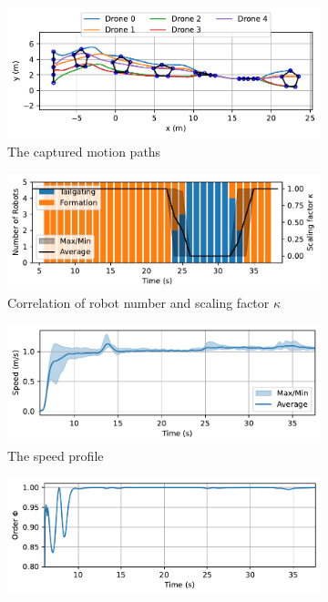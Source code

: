 \begin{figure}
    \centering
    \begin{subfigure}[b]{0.48\textwidth}
    \includegraphics[width=\textwidth]{paper3/images/gazebo_path.pdf}
    \caption{The captured motion paths}
    \label{fig:gazebo_path}
    \end{subfigure}
    \begin{subfigure}[b]{0.48\textwidth}
    \includegraphics[width=\textwidth]{paper3/images/gazebo_correlation.pdf}
    \caption{Correlation of robot number and scaling factor $\kappa$}
    \label{fig:gazebo_mode}
    \end{subfigure}
    \begin{subfigure}[b]{0.48\textwidth}
    \includegraphics[width=\textwidth]{paper3/images/gazebo_speed.pdf}
    \caption{The speed profile}
    \label{fig:gazebo_speed}
    \end{subfigure}
    \begin{subfigure}[b]{0.48\textwidth}
    \includegraphics[width=\textwidth]{paper3/images/gazebo_order.pdf}

\end{subfigure}
\end{figure}
